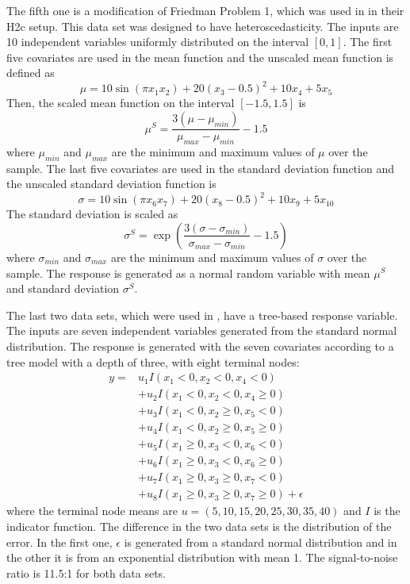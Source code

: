 The fifth one is a modification of Friedman Problem 1, which was used in \citet{hothorn_predictive_2021} in their H2c setup. This data set was designed to have heteroscedasticity. The inputs are 10 independent variables uniformly distributed on the interval $\left[0,1\right]$. The first five covariates are used in the mean function and the unscaled mean function is defined as $$\mu = 10 \sin\left(\pi x_1 x_2\right) + 20 \left(x_3 - 0.5\right)^2 + 10 x_4 + 5 x_5$$ Then, the scaled mean function on the interval $\left[-1.5,1.5\right]$ is $$\mu^{S} = \frac{3\left(\mu - \mu_{min}\right)}{\mu_{max} - \mu_{min}}-1.5 $$ where $\mu_{min}$ and $\mu_{max}$ are the minimum and maximum values of $\mu$ over the sample. The last five covariates are used in the standard deviation function and the unscaled standard deviation function is $$\sigma = 10 \sin\left(\pi x_6 x_7\right) + 20 \left(x_8 - 0.5\right)^2 + 10 x_9 + 5 x_{10}$$ The standard deviation is scaled as $$\sigma^{S}=\exp\left(\frac{3\left(\sigma-\sigma_{min}\right)}{\sigma_{max}-\sigma_{min}}-1.5\right)$$ where $\sigma_{min}$ and $\sigma_{max}$ are the minimum and maximum values of $\sigma$ over the sample. The response is generated as a normal random variable with mean $\mu^{S}$ and standard deviation $\sigma^{S}$.

The last two data sets, which were used in \citet{roy_prediction_2020}, have a tree-based response variable. The inputs are seven independent variables generated from the standard normal distribution. The response is generated with the seven covariates according to a tree model with a depth of three, with eight terminal nodes:
\begin{align*}
    y = & u_1 I\left(x_1<0, x_2<0, x_4<0\right)\\
        & + u_2 I\left(x_1<0, x_2<0, x_4 \geq 0\right)\\
        & + u_3 I\left(x_1<0, x_2 \geq 0, x_5<0\right)\\
        & + u_4 I\left(x_1<0, x_2 \geq 0, x_5 \geq 0\right)\\
        & + u_5 I\left(x_1 \geq 0, x_3<0, x_6<0\right)\\
        & + u_6 I\left(x_1 \geq 0, x_3<0, x_6 \geq 0\right)\\
        & + u_7 I\left(x_1 \geq 0, x_3 \geq 0, x_7<0\right)\\
        & + u_8 I\left(x_1 \geq 0, x_3 \geq 0, x_7 \geq 0\right) + \epsilon
\end{align*}
where the terminal node means are $u=\left(5, 10, 15, 20, 25, 30, 35, 40\right)$ and $I$ is the indicator function. The difference in the two data sets is the distribution of the error. In the first one, $\epsilon$ is generated from a standard normal distribution and in the other it is from an exponential distribution with mean 1. The signal-to-noise ratio is 11.5:1 for both data sets.

